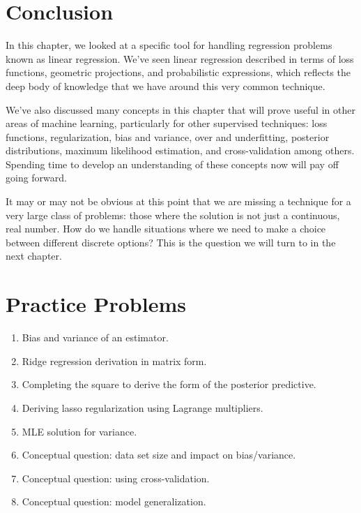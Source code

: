 \section{Conclusion}
In this chapter, we looked at a specific tool for handling regression problems known as linear regression. We've seen linear regression described in terms of loss functions, geometric projections, and probabilistic expressions, which reflects the deep body of knowledge that we have around this very common technique.

We've also discussed many concepts in this chapter that will prove useful in other areas of machine learning, particularly for other supervised techniques: loss functions, regularization, bias and variance, over and underfitting, posterior distributions, maximum likelihood estimation, and cross-validation among others. Spending time to develop an understanding of these concepts now will pay off going forward.

It may or may not be obvious at this point that we are missing a technique for a very large class of problems: those where the solution is not just a continuous, real number. How do we handle situations where we need to make a choice between different discrete options? This is the question we will turn to in the next chapter.

\section{Practice Problems}
\begin{enumerate}
    \item Bias and variance of an estimator.
    \item Ridge regression derivation in matrix form.
    \item Completing the square to derive the form of the posterior predictive.
    \item Deriving lasso regularization using Lagrange multipliers.
    \item MLE solution for variance.
    \item Conceptual question: data set size and impact on bias/variance.
    \item Conceptual question: using cross-validation.
    \item Conceptual question: model generalization.
\end{enumerate}
